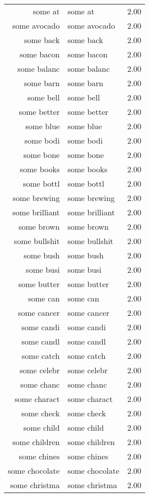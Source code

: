 \begin{table}[ht]
\begin{tabular}{rlr}
  some at & some at & 2.00 \\ 
  some avocado & some avocado & 2.00 \\ 
  some back & some back & 2.00 \\ 
  some bacon & some bacon & 2.00 \\ 
  some balanc & some balanc & 2.00 \\ 
  some barn & some barn & 2.00 \\ 
  some bell & some bell & 2.00 \\ 
  some better & some better & 2.00 \\ 
  some blue & some blue & 2.00 \\ 
  some bodi & some bodi & 2.00 \\ 
  some bone & some bone & 2.00 \\ 
  some books & some books & 2.00 \\ 
  some bottl & some bottl & 2.00 \\ 
  some brewing & some brewing & 2.00 \\ 
  some brilliant & some brilliant & 2.00 \\ 
  some brown & some brown & 2.00 \\ 
  some bullshit & some bullshit & 2.00 \\ 
  some bush & some bush & 2.00 \\ 
  some busi & some busi & 2.00 \\ 
  some butter & some butter & 2.00 \\ 
  some can & some can & 2.00 \\ 
  some cancer & some cancer & 2.00 \\ 
  some candi & some candi & 2.00 \\ 
  some candl & some candl & 2.00 \\ 
  some catch & some catch & 2.00 \\ 
  some celebr & some celebr & 2.00 \\ 
  some chanc & some chanc & 2.00 \\ 
  some charact & some charact & 2.00 \\ 
  some check & some check & 2.00 \\ 
  some child & some child & 2.00 \\ 
  some children & some children & 2.00 \\ 
  some chines & some chines & 2.00 \\ 
  some chocolate & some chocolate & 2.00 \\ 
  some christma & some christma & 2.00 \\ 

\end{tabular}
\end{table}
